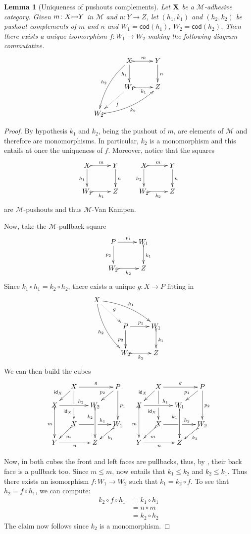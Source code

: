 \documentclass[a4paper]{article}
\newcommand{\id}[1]{\mathsf{id}_{#1}}
\newcommand{\cod}[1]{\mathsf{cod}({#1})}
\newcommand{\mto}[0]{\scalebox{1}{$\rightarrowtail$}}
\def\X{\textbf {\textup{X}}}
\def\Y{\textbf {\textup{Y}}}
\newtheorem{lemma}[theorem]{Lemma}
\theoremstyle{definition}
\begin{document}
\begin{lemma}[Uniqueness of pushouts complements]\label{lem:pocomp} 
Let $\X$ be a $\mathcal{M}$-adhesive category. Given $m\colon X\mto Y$ in $\mathcal{M}$ and $n\colon Y\to Z$, let $(h_1, k_1)$ and $(h_2, k_2)$ be pushout complements of $m$  and $n$ and $W_1=\cod{h_1}$, $W_2=\cod{h_2}$. Then there exists a unique isomorphism $f\colon W_1\to W_2$ making the following diagram commutative.
\[\xymatrix{&X \ar@{>->}[r]^{m} \ar[d]_{h_1} \ar@/_.3cm/[ddl]_{h_2}& Y \ar[d]^{n} \\ &W_1 \ar@{.>}[dl]^{f} \ar@{>->}[r]_{k_1} & Z \\ W_2 \ar@{>->}@/_.3cm/[urr]_{k_2}}\]
 
\end{lemma}
\begin{proof} By hypothesis
	$k_1$ and $k_2$, being the pushout of $m$, are elements of $\mathcal{M}$ and therefore are monomorphisms. In particular, $k_2$ is a monomorphism and this  entails at once the uniqueness of $f$.  Moreover, notice that the squares
	\[\xymatrix{X \ar@{>->}[r]^{m} \ar[d]_{h_1}& Y \ar[d]^{n}& X \ar[d]_{h_2}\ar@{>->}[r]^{m} & Y \ar[d]^{n}\\ W_1 \ar@{>->}[r]_{k_1} & Z & W_2 \ar@{>->}[r]_{k_2}& Z}\]
	are $\mathcal{M}$-pushouts and thus $\mathcal{M}$-Van Kampen.
	
Now, take the $\mathcal{M}$-pullback square
	\[\xymatrix{P\ar[r]^{p_1}  \ar[d]_{p_2}& W_1 \ar@{>->}[d]^{k_1}\\ W_2 \ar@{>->}[r]_{k_2} & Z}\]
	Since $k_1\circ h_1=k_2\circ h_2$, there exists a unique $g\colon X\to P$ fitting in
	\[\xymatrix{X \ar@/^.3cm/[drr]^{h_1} \ar@{.>}[dr]^{g} \ar@/_.3cm/[ddr]_{h_2}\\ &P\ar[r]^{p_1}  \ar[d]_{p_2}& W_1 \ar@{>->}[d]^{k_1}\\ &W_2 \ar@{>->}[r]_{k_2} & Z}\]
	We can then build the cubes
	\[\xymatrix@C=13pt@R=13pt{&X\ar[dd]|\hole_(.65){\id{X}}\ar[rr]^{g} \ar[dl]_{\id{X}} && P \ar[dd]^{p_1} \ar[dl]_{p_2} & &X\ar[dd]|\hole_(.65){\id{X}}\ar[rr]^{g} \ar[dl]_{\id{X}} && P \ar[dd]^{p_2} \ar[dl]_{p_1}\\ X  \ar@{>->}[dd]_{m}\ar[rr]^(.65){h_2} & & W_2 \ar@{>->}[dd]_(.3){k_2}& &  X  \ar@{>->}[dd]_{m}\ar[rr]^(.65){h_1} & & W_1 \ar@{>->}[dd]_(.3){k_1}\\&X\ar[rr]|\hole^(.65){h_1} \ar@{>->}[dl]^{m} && W_1 \ar@{>->}[dl]^{k_1} & &X\ar[rr]|\hole^(.65){h_2} \ar@{>->}[dl]^{m} && W_2 \ar@{>->}[dl]^{k_2}\\Y \ar[rr]_{n} & & Z & &Y \ar[rr]_{n} & & Z}\]
	
	Now, in both cubes the front and left faces are pullbacks, thus, by , their back face is a pullback too. Since $m\leq m$,  now entails that $k_1\leq k_2$ and $k_2\leq k_1$. Thus there exists an isomorphism $f\colon W_1\to W_2$ such that $k_1=k_2\circ f$. To see that $h_2=f\circ h_1$, we can compute:
	\begin{align*}
		k_2\circ f \circ h_1 & = k_1\circ h_1\\&= n\circ m\\&= k_2\circ h_2
	\end{align*}
	The claim now follows since $k_2$ is a monomorphism. \qedhere 
\end{proof}
\end{document}
